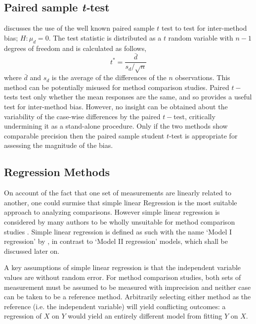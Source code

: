 \documentclass[12pt, a4paper]{report}
\theoremstyle{plain}
\theoremstyle{definition}
\theoremstyle{remark}
\begin{document}
	
	\subsection*{Paired sample \emph{t-}test}
	\citet{Bartko} discusses the use of the well known paired sample $t$ test to test for inter-method bias; $H: \mu_{d}=0$. The test
	statistic is distributed as a $t$ random variable with $n-1$ degrees of freedom and is calculated as follows,
	\begin{equation}
	t^{*} = \frac{\bar{d}}{ s_d/\sqrt{n}}
	\end{equation}
	where $\bar{d}$ and $s_{d}$ is the average of the differences of the $n$ observations. This method can be potentially misused for method comparison studies. Paired $t-$tests test only whether the mean responses are the same, and so provides a useful test for inter-method bias. However, no insight can be obtained about the variability of the case-wise differences by the paired $t-$test, critically undermining it as a stand-alone procedure. Only if the two methods show comparable
	precision then the paired sample student $t$-test is appropriate for assessing the magnitude of the bias.

	

	\subsection*{Regression Methods}
		On account of the fact that one set of measurements are linearly related to another, one could surmise that simple linear Regression is the most suitable approach to analyzing comparisons. However simple linear regression  is considered by many authors to be wholly unsuitable for method comparison studies \citep{BA83,CornCoch,ludbrook97}. Simple linear regression is defined as such with the name `Model I regression' by \citet{CornCoch}, in contrast to `Model II regression' models, which shall be discussed later on.
		
		A key assumptions of simple linear regression is that the independent variable values are without random error. 	
		For method comparison studies, both sets of measurement must be assumed to be measured with imprecision and neither case can be taken to be a reference method. Arbitrarily
		selecting either method as the reference (i.e. the independent variable) will yield conflicting outcomes: a regression of $X$ on $Y$ would yield an entirely different model from fitting $Y$ on $X$.
	
\end{document}
